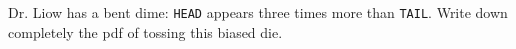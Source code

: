 Dr. Liow has a bent dime: \texttt{HEAD} appears
three times more than \texttt{TAIL}.
Write down completely the pdf of tossing this biased die.
